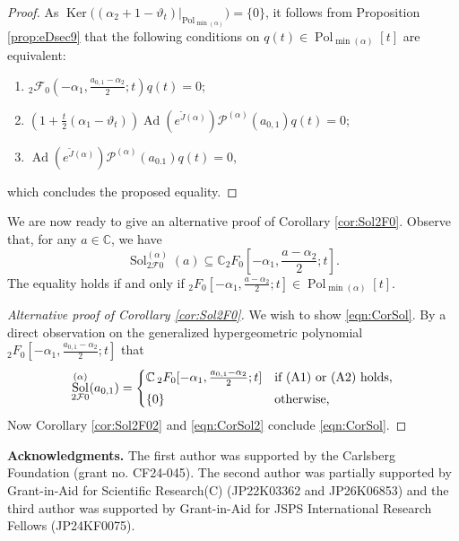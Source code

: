 \documentclass[a4paper,11pt,reqno]{amsart}
\newcommand{\CC}{\mathbb{C}}
\newcommand{\calF}{\mathcal{F}}
\newcommand{\calP}{\mathcal{P}}
\newcommand{\0}{{\bf 0}}
\newcommand{\C}{\mathbb{C}}
\newcommand{\1}{{\bf 1}}
\DeclareMathOperator{\Ad}{Ad}
\DeclareMathOperator{\Pol}{Pol}
\DeclareMathOperator{\Sol}{Sol}
\newcommand{\wJ}{\widetilde{J}}
\DeclareMathOperator{\Ker}{Ker}
\theoremstyle{plain}
\theoremstyle{definition}
\numberwithin{equation}{section}
\theoremstyle{definition}
\begin{document}
\begin{appendices}
\begin{proof}
As $\Ker\big( (\alpha_2+1-\vartheta_t)\vert_{\Pol_{\min(\alpha)}}\big)=\{0\}$,
it follows from Proposition \ref{prop:eDsec9} that
the following conditions on $q(t) \in \Pol_{\min(\alpha)}[t]$ are equivalent:
\vspace{3pt}
\begin{enumerate}[label=\normalfont{(\roman*)}]
\item ${}_2\calF_0(-\alpha_1,\tfrac{a_{0,1}-\alpha_2}{2};t)q(t)=0$;
\vspace{2pt}
\item 
$(1+\tfrac{t}{2}(\alpha_1-\vartheta_t))\Ad(e^{\wJ(\alpha)})\calP^{(\alpha)}(a_{0,1})q(t)=0$;
\vspace{3pt}
\item $\Ad(e^{\wJ(\alpha)})\calP^{(\alpha)}(a_{0.1})q(t)=0$,
\end{enumerate}
which concludes the proposed equality.
\end{proof}

We are now ready to give an alternative proof of Corollary \ref{cor:Sol2F0}.
Observe that, for any $a\in \C$,  we have 
\begin{equation*}
\Sol^{(\alpha)}_{2\calF0}(a) \subseteq \C 
{}_2F_0[-\alpha_1, \frac{a-\alpha_2}{2};t].
\end{equation*}
The equality holds if and only if 
${}_2F_0[-\alpha_1, \frac{a-\alpha_2}{2};t] \in \Pol_{\min(\alpha)}[t]$.

\begin{proof}[Alternative proof of Corollary \ref{cor:Sol2F0}]
We wish to show \eqref{eqn:CorSol}. 
By a direct observation on the generalized hypergeometric polynomial
${}_2F_0[-\alpha_1, \frac{a_{0,1}-\alpha_2}{2};t]$ that 
\begin{equation}\label{eqn:CorSol2}
\Sol^{(\alpha)}_{2\calF0}(a_{0,1})
=
\begin{cases}
\CC\, 
{}_2F_0[-\alpha_1,\tfrac{a_{0,1}-\alpha_2}{2};t]
& 
\textnormal{if (A1) or (A2) holds,}\\[3pt]
\{0\} & \textnormal{otherwise,}
\end{cases}
\end{equation}
Now Corollary \ref{cor:Sol2F02} and \eqref{eqn:CorSol2}
conclude \eqref{eqn:CorSol}.
\end{proof}


\end{appendices}

\noindent
\textbf{Acknowledgments.}
The first author was supported by the Carlsberg Foundation (grant no. CF24-045).
The second author was partially supported by 
Grant-in-Aid for Scientific Research(C) (JP22K03362 and JP26K06853) and
the third author was supported by Grant-in-Aid for 
JSPS International Research Fellows (JP24KF0075).






\end{document}
